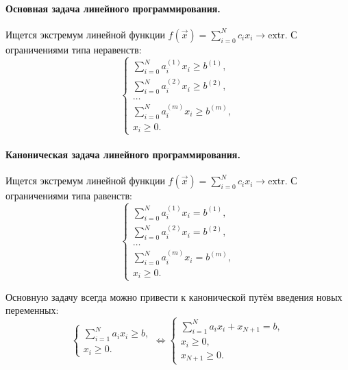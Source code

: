

\paragraph{Основная задача линейного программирования.}
Ищется экстремум линейной функции $f(\vec{x}) = \sum_{i=0}^N c_i x_i \to \text{extr}$.
С ограничениями типа неравенств:
\[
  \begin{cases}
    \sum_{i=0}^N a^{(1)}_i x_i \geqslant b^{(1)}, \\
    \sum_{i=0}^N a^{(2)}_i x_i \geqslant b^{(2)}, \\
    \dots \\
    \sum_{i=0}^N a^{(m)}_i x_i \geqslant b^{(m)}, \\
    x_i \geqslant 0.
  \end{cases}
\]

\paragraph{Каноническая задача линейного программирования.}
Ищется экстремум линейной функции $f(\vec{x}) = \sum_{i=0}^N c_i x_i \to \text{extr}$.
С ограничениями типа равенств:
\[
  \begin{cases}
    \sum_{i=0}^N a^{(1)}_i x_i = b^{(1)}, \\
    \sum_{i=0}^N a^{(2)}_i x_i = b^{(2)}, \\
    \dots \\
    \sum_{i=0}^N a^{(m)}_i x_i = b^{(m)}, \\
    x_i \geqslant 0.
  \end{cases}
\]

Основную задачу всегда можно привести к канонической путём введения новых переменных:
\[
  \begin{cases}
      \sum_{i=1}^N a_i x_i \geqslant b, \\
      x_i \geqslant 0.
  \end{cases}
  \Leftrightarrow
  \begin{cases}
    \sum_{i=1}^N a_i x_i + x_{N+1} = b, \\
    x_i \geqslant 0, \\
    x_{N+1} \geqslant 0.
  \end{cases}
\]

